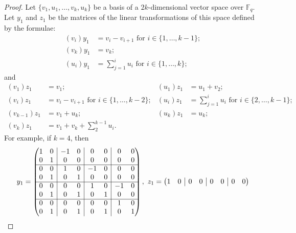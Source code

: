 \begin{proof}
Let $\{v_1, u_1, \ldots, v_k, u_k\}$ be a basis of a $2k$-dimensional vector space over $\mathbb{F}_q.$ Let $y_1$ and $z_1$ be the matrices of the linear transformations of this space defined by the formulae:
\begin{equation*}
\begin{split}
(v_i)y_1 &=v_i - v_{i+1} \text{ for } i \in \{1, \ldots, k-1\};\\
(v_k)y_1 &= v_k;\\
(u_i)y_1 &= \sum_{j=1}^i u_i \text{ for } i \in \{1, \ldots, k\};
\end{split}
\end{equation*}
and  
\begin{align*}
(v_1)z_1 &=v_1; &(u_1)z_1 &= u_1+v_2;\\
(v_i)z_1 &=v_i - v_{i+1} \text{ for } i \in \{1, \ldots, k-2\}; &(u_i)z_1 &= \sum_{j=1}^i u_i \text{ for } i \in \{2, \ldots, k-1\};\\
(v_{k-1})z_1 &=v_1 + u_{k}; &(u_k)z_1 &= u_k;\\
(v_k)z_1 &= v_1 + v_k + \sum_2^{k-1}u_i.
\end{align*} 
For example, if $k=4$, then 
\begin{equation*} y_1=
\begin{pmatrix}
1      & \multicolumn{1}{c|}{0}& -1& \multicolumn{1}{c|}{0}&0  &\multicolumn{1}{c|}{0}&0&0   \\
0      & \multicolumn{1}{c|}{1}& 0 & \multicolumn{1}{c|}{0}&0  &\multicolumn{1}{c|}{0}&0&0 \\ \cline{1-8}
0      & \multicolumn{1}{c|}{0}& 1 & \multicolumn{1}{c|}{0}& -1&\multicolumn{1}{c|}{0}&0&0   \\
0      & \multicolumn{1}{c|}{1}& 0 & \multicolumn{1}{c|}{1}& 0 &\multicolumn{1}{c|}{0}&0&0   \\\cline{1-8}
0      & \multicolumn{1}{c|}{0}& 0 & \multicolumn{1}{c|}{0}& 1 &\multicolumn{1}{c|}{0}&-1&0 \\       
0      & \multicolumn{1}{c|}{1}& 0 & \multicolumn{1}{c|}{1}& 0 &\multicolumn{1}{c|}{1}&0&0   \\\cline{1-8}
0      & \multicolumn{1}{c|}{0}& 0 & \multicolumn{1}{c|}{0}& 0 &\multicolumn{1}{c|}{0}& 1 &        0\\
0      & \multicolumn{1}{c|}{1}& 0 & \multicolumn{1}{c|}{1}& 0 &\multicolumn{1}{c|}{1}& 0 &        1
\end{pmatrix}, \text{ }
z_1=
\begin{pmatrix}
1      & \multicolumn{1}{c|}{0}& 0 & \multicolumn{1}{c|}{0}&0  &\multicolumn{1}{c|}{0}&0&0   \\

\end{pmatrix}
\end{equation*}
\end{proof}
